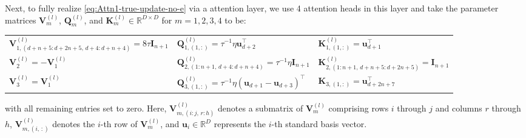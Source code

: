 \documentclass[english]{article}
\begin{document}
\begin{itemize}
Next, to fully realize \eqref{eq:Attn1-true-update-no-e} via a attention layer, we use 4 attention heads in this layer and take the parameter matrices ${\bm V}_m^{(l)}$, ${\bm Q}_m^{(l)}$, and ${\bm K}_m^{(l)}\in\mathbb{R}^{D\times D}$ for $m = 1,2,3,4$ to be:
%
\begin{table}[H]
\begin{tabular}{ l l l }
${\bm V}_{1,(d+n+5:d+2n+5,\,d+4:d+n+4)}^{(l)} = 8\tau {\bm I}_{n+1}$ & ${\bm Q}_{1,(1,:)}^{(l)} = \tau^{-1}\eta {\bm u}_{d+2}^{\top}$ & ${\bm K}_{1,(1,:)}^{(l)} ={\bm u}_{d+1}^{\top}$\\
${\bm V}_2^{(l)} = -{\bm V}_1^{(l)}$ & $ {\bm Q}_{2,(1:n+1,\,d+4:d+n+4)}^{(l)} = \tau^{-1}\eta {\bm I}_{n+1}$ & $ {\bm K}_{2,(1:n+1,\,d+n+5:d+2n+5)}^{(l)} = {\bm I}_{n+1}$\\
${\bm V}_3^{(l)} = {\bm V}_1^{(l)}$ & $ {\bm Q}_{3,(1,:)}^{(l)} = \tau^{-1}\eta({\bm u}_{d+1} - {\bm u}_{d+3})^{\top}$ & ${\bm K}_{3,(1,:)} = {\bm u}_{d+2n+7}^{\top}$
\end{tabular}
\end{table}

with all remaining entries set to zero.
Here, ${\bm V}_{m,(i:j,\,r:h)}^{(l)}$ denotes a submatrix of ${\bm V}_m^{(l)}$ comprising rows $i$ through $j$ and columns  $r$ through $h$,  ${\bm V}_{m,(i,\,:)}^{(l)}$ denotes the $i$-th row of ${\bm V}_m^{(l)}$, and ${\bm u}_i\in\mathbb{R}^{D}$ represents the $i$-th standard basis vector.


\end{itemize}
\end{document}
